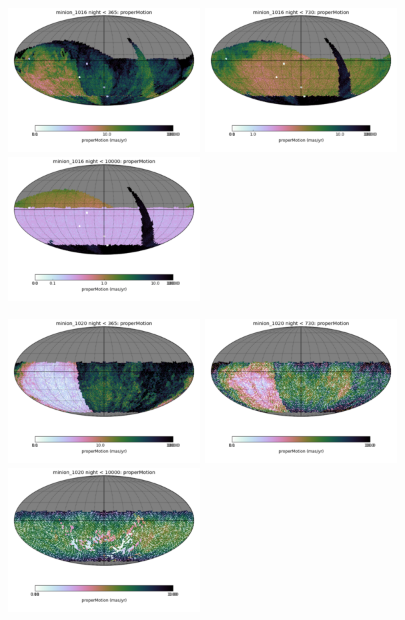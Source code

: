 \begin{figure}[ht]
  \begin{center}
  \includegraphics[width=2.0in]{./figs/milkyway/astromPanels/MW_Astrom_pmError_Baseline_01y_map.png}
  \includegraphics[width=2.0in]{./figs/milkyway/astromPanels/MW_Astrom_pmError_Baseline_02y_map.png}
  \includegraphics[width=2.0in]{./figs/milkyway/astromPanels/MW_Astrom_pmError_Baseline_10y_map.png}
  \end{center}
  \begin{center}
  \includegraphics[width=2.0in]{./figs/milkyway/astromPanels/MW_Astrom_pmError_PanSTARRS_01y_map.png}
  \includegraphics[width=2.0in]{./figs/milkyway/astromPanels/MW_Astrom_pmError_PanSTARRS_02y_map.png}
  \includegraphics[width=2.0in]{./figs/milkyway/astromPanels/MW_Astrom_pmError_PanSTARRS_10y_map.png}
  \end{center}


\end{figure}
